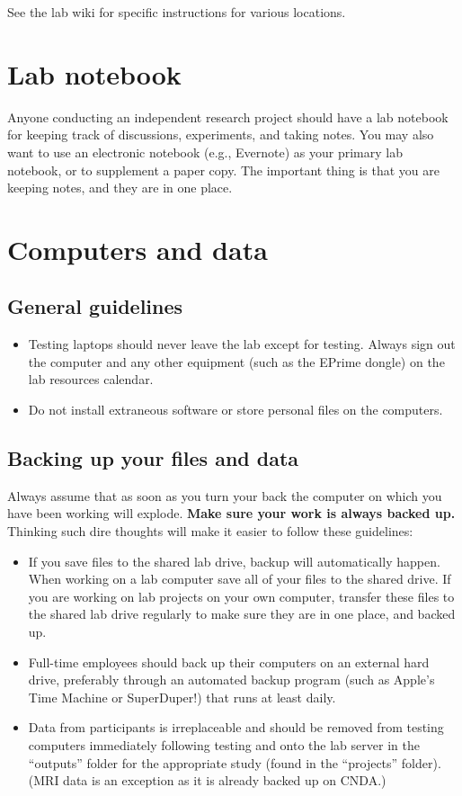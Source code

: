 \documentclass[letterpaper,12pt,oneside]{memoir}
\begin{document}
 See the lab wiki for specific instructions for various locations.



\section{Lab notebook}
\label{sec:lab_notebook}

Anyone conducting an independent research project should have a lab notebook for keeping track of discussions, experiments, and taking notes. You may also want to use an electronic notebook (e.g., Evernote) as your primary lab notebook, or to supplement a paper copy. The important thing is that you are keeping notes, and they are in one place.

\section{Computers and data}

\subsection{General guidelines}

\begin{itemize}
\item Testing laptops should never leave the lab except for testing. Always sign out the computer and any other equipment (such as the EPrime dongle) on the lab resources calendar.
\item Do not install extraneous software or store personal files on the computers.
\end{itemize}

\subsection{Backing up your files and data}

Always assume that as soon as you turn your back the computer on which you have been working will explode. \textbf{Make sure your work is always backed up.} Thinking such dire thoughts will make it easier to follow these guidelines:

\begin{itemize}
\item If you save files to the shared lab drive, backup will automatically happen. When working on a lab computer save all of your files to the shared drive. If you are working on lab projects on your own computer, transfer these files to the shared lab drive regularly to make sure they are in one place, and backed up.
\item Full-time employees should back up their computers on an external hard drive, preferably through an automated backup program (such as Apple's Time Machine or SuperDuper!) that runs at least daily.
\item Data from participants is irreplaceable and should be removed from testing computers immediately following testing and onto the lab server in the ``outputs'' folder for the appropriate study (found in the ``projects'' folder). (MRI data is an exception as it is already backed up on CNDA.)
\end{itemize}
\end{document}

